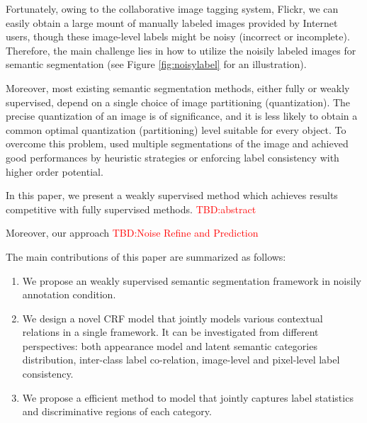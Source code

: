 \if
 Fortunately, owing to the collaborative image tagging system, \eg Flickr, we can easily obtain a large mount of manually labeled images provided by Internet users, though these image-level labels might be noisy (incorrect or incomplete). Therefore, the main challenge lies in how to utilize the noisily labeled images for semantic segmentation (see Figure \ref{fig:noisylabel} for an illustration).


 Moreover, most existing semantic segmentation methods, either fully or weakly supervised, depend on a single choice of image partitioning (quantization). The precise quantization of an image is of significance, and it is less likely to obtain a common optimal quantization (partitioning) level suitable for every object. To overcome this problem, \cite{hoiem2005geometric,kohli2009robust,ladicky2009associative,nowozin2010parameter,russell2006using} used multiple segmentations of the image and achieved good performances by heuristic strategies or enforcing label consistency with higher order potential.
\fi


In this paper, we present a weakly supervised method which achieves results competitive with fully supervised methods. {\textcolor{red}{TBD:abstract}}

Moreover, our approach {\textcolor{red}{TBD:Noise Refine and Prediction}}

The main contributions of this paper are summarized as follows:
\begin{enumerate}
  \item We propose an weakly supervised semantic segmentation framework in noisily annotation condition.
  \item We design a novel CRF model that jointly models various contextual relations in a single framework. It can be investigated from different perspectives: both appearance model and latent semantic categories distribution, inter-class label co-relation, image-level and pixel-level label consistency.
  \item We propose a efficient method to model that jointly captures label statistics and discriminative regions of each category.
\end{enumerate}
